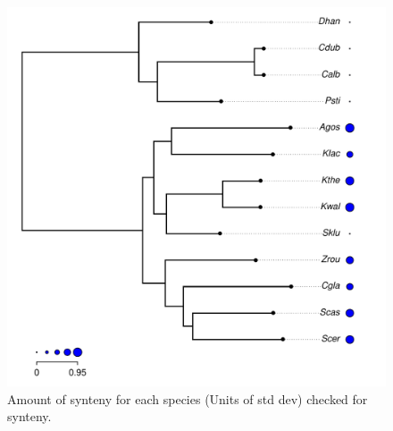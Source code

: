 \documentclass[12pt]{article}
\begin{document}
\begin{figure}[H]
     \centering
	\includegraphics[width=\textwidth]{img/synteny_coverage.pdf}
	\caption{Amount of synteny for each species (Units of std dev) checked for synteny.}
	\label{fig:synteny_species}
\end{figure}
\end{document}
